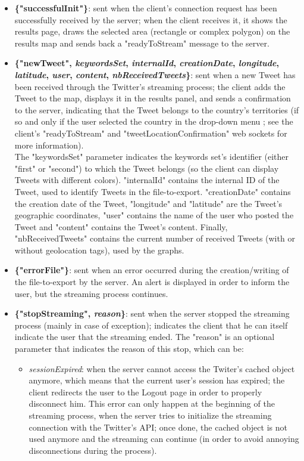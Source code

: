 \documentclass[a4paper,11pt]{report}
\begin{document}
\begin{itemize}
	\item \textbf{\{"successfulInit"\}}: sent when the client's connection request has been successfully received by the server; when the client receives it, it shows the results page, draws the selected area (rectangle or complex polygon) on the results map and sends back a "readyToStream" message to the server.
	\item \textbf{\{"newTweet", \textit{keywordsSet}, \textit{internalId}, \textit{creationDate}, \textit{longitude}, \textit{latitude}, \textit{user}, \textit{content}, \textit{nbReceivedTweets}\}}: sent when a new Tweet has been received through the Twitter's streaming process; the client adds the Tweet to the map, displays it in the results panel, and sends a confirmation to the server, indicating that the Tweet belongs to the country's territories (if so and only if the user selected the country in the drop-down menu ; see the client's "readyToStream" and "tweetLocationConfirmation" web sockets for more information).\\The "keywordsSet" parameter indicates the keywords set's identifier (either "first" or "second") to which the Tweet belongs (so the client can display Tweets with different colors). "internalId" contains the internal ID of the Tweet, used to identify Tweets in the file-to-export. "creationDate" contains the creation date of the Tweet, "longitude" and "latitude" are the Tweet's geographic coordinates, "user" contains the name of the user who posted the Tweet and "content" contains the Tweet's content. Finally, "nbReceivedTweets" contains the current number of received Tweets (with or without geolocation tags), used by the graphs.
	\item \textbf{\{"errorFile"\}}: sent when an error occurred during the creation/writing of the file-to-export by the server. An alert is displayed in order to inform the user, but the streaming process continues.
	\item \textbf{\{"stopStreaming", \textit{reason}\}}: sent when the server stopped the streaming process (mainly in case of exception); indicates the client that he can itself indicate the user that the streaming ended. The "reason" is an optional parameter that indicates the reason of this stop, which can be:
	\begin{itemize}
		\item \emph{sessionExpired}: when the server cannot access the Twiter's cached object anymore, which means that the current user's session has expired; the client redirects the user to the Logout page in order to properly disconnect him. This error can only happen at the beginning of the streaming process, when the server tries to initialize the streaming connection with the Twitter's API; once done, the cached object is not used anymore and the streaming can continue (in order to avoid annoying disconnections during the process).

\end{itemize}
\end{itemize}
\end{document}
